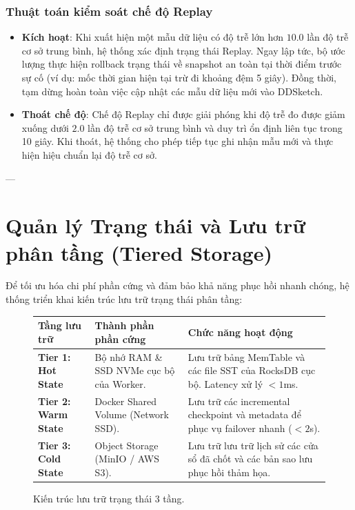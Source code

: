 \documentclass[12pt,a4paper]{article}
\begin{document}
\subsubsection{Thuật toán kiểm soát chế độ Replay}
\begin{itemize}
    \item \textbf{Kích hoạt}: Khi xuất hiện một mẫu dữ liệu có độ trễ lớn hơn $10.0$ lần độ trễ cơ sở trung bình, hệ thống xác định trạng thái Replay. Ngay lập tức, bộ ước lượng thực hiện rollback trạng thái về snapshot an toàn tại thời điểm trước sự cố (ví dụ: mốc thời gian hiện tại trừ đi khoảng đệm 5 giây). Đồng thời, tạm dừng hoàn toàn việc cập nhật các mẫu dữ liệu mới vào DDSketch.
    \item \textbf{Thoát chế độ}: Chế độ Replay chỉ được giải phóng khi độ trễ đo được giảm xuống dưới $2.0$ lần độ trễ cơ sở trung bình và duy trì ổn định liên tục trong 10 giây. Khi thoát, hệ thống cho phép tiếp tục ghi nhận mẫu mới và thực hiện hiệu chuẩn lại độ trễ cơ sở.
\end{itemize}

---

\section{Quản lý Trạng thái và Lưu trữ phân tầng (Tiered Storage)}

Để tối ưu hóa chi phí phần cứng và đảm bảo khả năng phục hồi nhanh chóng, hệ thống triển khai kiến trúc lưu trữ trạng thái phân tầng:

\begin{figure}[h]
\centering
\begin{tabular}{p{} p{} p{}}
\toprule
\textbf{Tầng lưu trữ} & \textbf{Thành phần phần cứng} & \textbf{Chức năng hoạt động} \\
\midrule
\textbf{Tier 1: Hot State} & Bộ nhớ RAM \& SSD NVMe cục bộ của Worker. & Lưu trữ bảng MemTable và các file SST của RocksDB cục bộ. Latency xử lý $< 1$ms. \\
\textbf{Tier 2: Warm State} & Docker Shared Volume (Network SSD). & Lưu trữ các incremental checkpoint và metadata để phục vụ failover nhanh ($< 2$s). \\
\textbf{Tier 3: Cold State} & Object Storage (MinIO / AWS S3). & Lưu trữ lưu trữ lịch sử các cửa sổ đã chốt và các bản sao lưu phục hồi thảm họa. \\
\bottomrule
\end{tabular}
\caption{Kiến trúc lưu trữ trạng thái 3 tầng.}
\end{figure}
\end{document}
